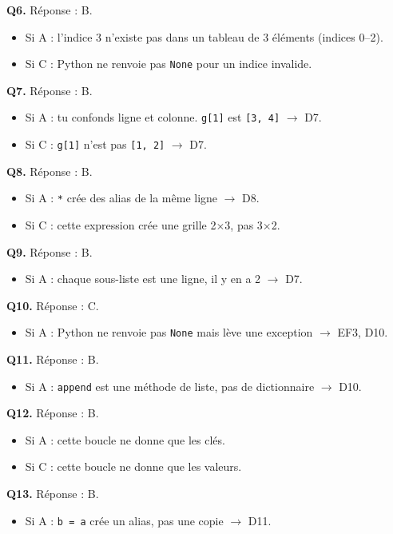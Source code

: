 \textbf{Q6.} Réponse : B.
\begin{itemize}[nosep]
  \item Si A : l'indice 3 n'existe pas dans un tableau de 3 éléments (indices 0--2).
  \item Si C : Python ne renvoie pas \lstinline{None} pour un indice invalide.
\end{itemize}

\textbf{Q7.} Réponse : B.
\begin{itemize}[nosep]
  \item Si A : tu confonds ligne et colonne. \lstinline{g[1]} est \lstinline{[3, 4]} $\to$ D7.
  \item Si C : \lstinline{g[1]} n'est pas \lstinline{[1, 2]} $\to$ D7.
\end{itemize}

\textbf{Q8.} Réponse : B.
\begin{itemize}[nosep]
  \item Si A : \lstinline{*} crée des alias de la même ligne $\to$ D8.
  \item Si C : cette expression crée une grille 2$\times$3, pas 3$\times$2.
\end{itemize}

\textbf{Q9.} Réponse : B.
\begin{itemize}[nosep]
  \item Si A : chaque sous-liste est une ligne, il y en a 2 $\to$ D7.
\end{itemize}

\textbf{Q10.} Réponse : C.
\begin{itemize}[nosep]
  \item Si A : Python ne renvoie pas \lstinline{None} mais lève une exception $\to$ EF3, D10.
\end{itemize}

\textbf{Q11.} Réponse : B.
\begin{itemize}[nosep]
  \item Si A : \lstinline{append} est une méthode de liste, pas de dictionnaire $\to$ D10.
\end{itemize}

\textbf{Q12.} Réponse : B.
\begin{itemize}[nosep]
  \item Si A : cette boucle ne donne que les clés.
  \item Si C : cette boucle ne donne que les valeurs.
\end{itemize}

\textbf{Q13.} Réponse : B.
\begin{itemize}[nosep]
  \item Si A : \lstinline{b = a} crée un alias, pas une copie $\to$ D11.
\end{itemize}

